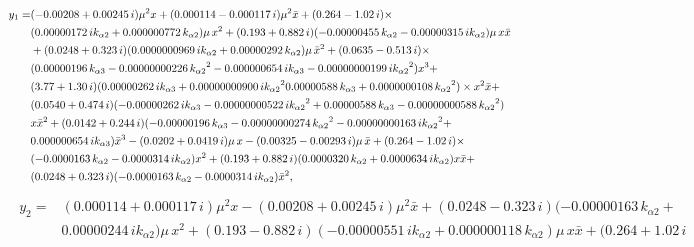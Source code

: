 \documentclass[openacc]{rsproca_new}%
\begin{document}
\begin{appendices}
\begin{align}
\begin{split}
  y_1=&( - 0.00208+ 0.00245\,i ) { \mu}^{2}x+ (  0.000114-
  0.000117\,i ) { \mu}^{2}\bar {x}+ (  0.264- 1.02\,i ) \times\\
  &(  0.00000172\,i{  k_{\alpha 2}}+ 0.000000772\,{  k_{\alpha 2}} )  \mu\,{
  x}^{2}+ (  0.193+ 0.882\,i )  ( - 0.00000455\,{  k_{\alpha 2}
  }- 0.00000315\,i{  k_{\alpha 2}} )  \mu\,x\bar {x}\\
  &+(  0.0248+ 0.323\,i)
  (  0.0000000969\,i{  k_{\alpha 2}}+ 0.00000292\,{  k_{\alpha 2}}
  )  \mu\,{\bar {x}}^{2}+ (  0.0635- 0.513\,i ) \times \\
&  (
  0.00000196\,{  k_{\alpha 3}}- 0.00000000226\,{{  k_{\alpha 2}}}^{2}- 0.000000654\,i
  {  k_{\alpha 3}}- 0.00000000199\,i{{  k_{\alpha 2}}}^{2} ) {x}^{3}+ \\
&  (
  3.77+ 1.30\,i )  (  0.00000262\,i{  k_{\alpha 3}}+ 0.00000000900
  \,i{{  k_{\alpha 2}}}^{2}\-0.00000588\,{  k_{\alpha 3}}+ 0.0000000108\,{{  k_{\alpha 2}}}^{
  2} ) \times
  {x}^{2}\bar {x}+ \\&(  0.0540+ 0.474\,i )  ( -
  0.00000262\,i{  k_{\alpha 3}}- 0.00000000522\,i{{  k_{\alpha 2}}}^{2}+ 0.00000588\,
  {  k_{\alpha 3}}-0.00000000588\,{{  k_{\alpha 2}}}^{2} )\\
  &x{\bar {x}}^{2}+(
  0.0142+ 0.244\,i )  ( - 0.00000196\,{  k_{\alpha 3}}-
  0.00000000274\,{{  k_{\alpha 2}}}^{2}- 0.00000000163\,i{{  k_{\alpha 2}}}^{2}+
  \\&0.000000654\,i{  k_{\alpha 3}} ) {\bar {x}}^{3}- (  0.0202+ 0.0419\,i
  )  \mu\,x- (  0.00325- 0.00293\,i )  \mu\,\bar {x}+ (
  0.264- 1.02\,i ) \times \\& ( - 0.0000163\,{  k_{\alpha 2}}- 0.0000314\,i{
    k_{\alpha 2}} ) {x}^{2}+ (  0.193+ 0.882\,i )  (
  0.0000320\,{  k_{\alpha 2}}+ 0.0000634\,i{  k_{\alpha 2}} ) x\bar {x}+\\&(0.0248+ 0.323\,i )  ( - 0.0000163\,{  k_{\alpha 2}}- 0.0000314\,i
  {  k_{\alpha 2}} ) {\bar {x}}^{2},
\end{split}
\end{align}
\begin{align}
\begin{split}
  y_2=&(  0.000114+ 0.000117\,i ) {\mu}^{2}x- (  0.00208+
  0.00245\,i ) {\mu}^{2}\bar x+ (  0.0248- 0.323\,i )
  ( - 0.00000163\,{k_{\alpha 2}}+\\
   &0.00000244\,i{k_{\alpha 2}} ) \mu\,{
  x}^{2}+ (  0.193- 0.882\,i )  ( - 0.00000551\,i{
  k_{\alpha 2}}+ 0.000000118\,{k_{\alpha 2}} ) \mu\,x\bar x+ (  0.264+ 1.02\,i

\end{split}
\end{align}
\end{appendices}
\end{document}

